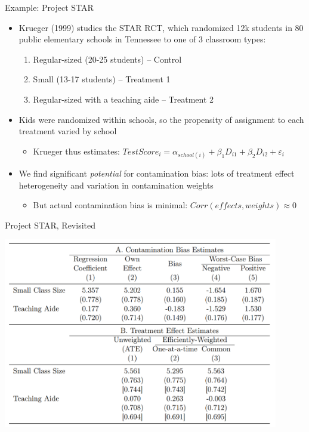 \documentclass[11pt,english]{beamer}
\begin{document}
\begin{frame}{Example: Project STAR}

\begin{itemize}
\item Krueger (1999) studies the STAR RCT, which randomized 12k students in 80 public elementary schools in Tennessee to one of 3 classroom types:\smallskip
\begin{enumerate}
\item Regular-sized (20-25 students) -- Control\smallskip
\item Small (13-17 students) -- Treatment 1\smallskip
\item Regular-sized with a teaching aide -- Treatment 2
\end{enumerate}\bigskip\pause{}

\item Kids were randomized within schools, so the propensity of assignment to each treatment varied by school\smallskip
\begin{itemize}
\item Krueger thus estimates: $TestScore_i= \alpha_{school(i)}+\beta_1 D_{i1} + \beta_2 D_{i2} +\varepsilon_i$
\end{itemize}\bigskip\pause{}

\item We find significant \emph{potential} for contamination bias: lots of treatment effect heterogeneity and variation in contamination weights\smallskip
\begin{itemize}
\item But actual contamination bias is minimal: $Corr(effects,weights)\approx 0$
\end{itemize}
\end{itemize}

\end{frame}

\begin{frame}{Project STAR, Revisited}

\begin{center}
	\includegraphics[width=0.9\textwidth]{figures/STAR_CB.png}
\end{center}

\end{frame}
\end{document}
